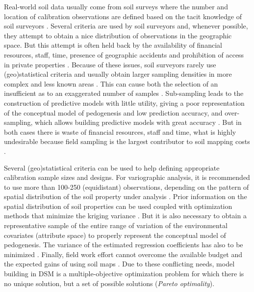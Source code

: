Real-world soil data usually come from soil surveys where the number and 
location of calibration observations are defined based on the tacit knowledge 
of soil surveyors \cite{BrusEtAl2007a}. Several criteria are used by soil 
surveyors and, whenever possible, they attempt to obtain a nice distribution of 
observations in the geographic space. But this attempt is often held back by the
availability of financial resources, staff, time, presence of geographic 
accidents and prohibition of access in private properties \cite{KempenEtAl2012,
SamuelRosa2012}. Because of these issues, soil surveyors rarely use 
(geo)statistical criteria and usually obtain larger sampling densities in more 
complex and less known areas \cite{Rossiter2000}. This can cause both the 
selection of an insufficient as to an exaggerated number of samples 
\cite{vanGroenigenEtAl1999}. Sub-sampling leads to the construction of 
predictive models with little utility, giving a poor representation of the 
conceptual model of pedogenesis and low prediction accuracy, and over-sampling,
which allows building predictive models with great accuracy 
\cite{vanGroenigenEtAl1999}. But in both cases there is waste of financial 
resources, staff and time, what is highly undesirable because field sampling 
is the largest contributor to soil mapping costs \cite{vanGroenigenEtAl1999,
KempenEtAl2012, SamuelRosa2012}.

Several (geo)statistical criteria can be used to help defining appropriate 
calibration sample sizes and designs. For variographic analysis, it is 
recommended to use more than 100-250 (equidistant) observations, depending on 
the pattern of spatial distribution of the soil property under analysis 
\cite{WebsterEtAl2007}. Prior information on the spatial distribution of soil 
properties can be used coupled with optimization methods that minimize the 
kriging variance \cite{vanGroenigenEtAl1999, BrusEtAl2007a}. But it is also 
necessary to obtain a representative sample of the entire range of variation of 
the environmental covariates (attribute space) \cite{HenglEtAl2003a} to 
properly represent the conceptual model of pedogenesis. The variance of the 
estimated regression coefficients has also to be minimized \cite{BrusEtAl2007a}.
Finally, field work effort cannot overcome the available budget and the expected
gains of using soil maps \cite{KempenEtAl2012}. Due to these conflicting needs, 
model building in DSM is a multiple-objective optimization problem for which 
there is no unique solution, but a set of possible solutions (\textit{Pareto 
optimality}).

